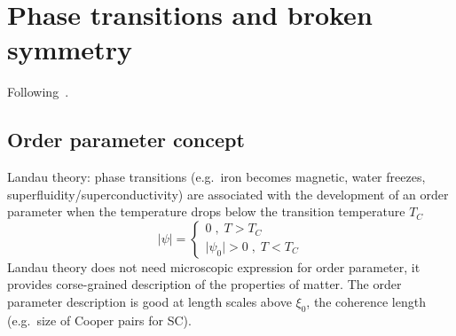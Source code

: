 \documentclass[../main.tex]{subfiles}
\begin{document}






\section{Phase transitions and broken symmetry}

Following~\cite[ch. 11]{colemanIntroductionManyBodyPhysics2015}.

\subsection{Order parameter concept}

Landau theory: phase transitions (e.g.\ iron becomes magnetic, water freezes, superfluidity/superconductivity) are associated with the development of an order parameter when the temperature drops below the transition temperature \(T_C\) 
\begin{equation}
    \vert \psi \vert =
    \begin{cases}
        0\;,\; T > T_C \\
        \vert \psi_0 \vert > 0 \;,\; T < T_C
    \end{cases}
\end{equation}
Landau theory does not need microscopic expression for order parameter, it provides corse-grained description of the properties of matter.
The order parameter description is good at length scales above \(\xi_0\), the coherence length (e.g.\ size of Cooper pairs for SC).
\end{document}
